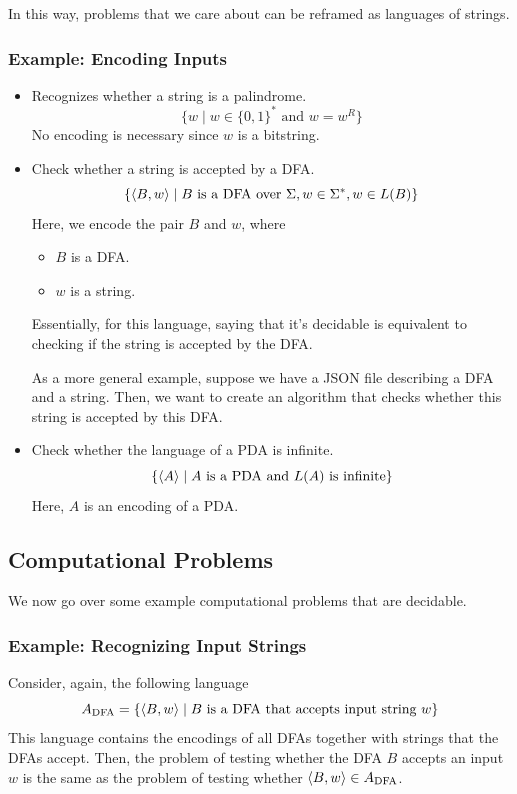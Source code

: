\documentclass[letterpaper]{article}
\begin{document}
In this way, problems that we care about can be reframed as languages of strings. 

\subsubsection{Example: Encoding Inputs}
\begin{itemize}
    \item Recognizes whether a string is a palindrome. 
    \[\{w \mid w \in \{0, 1\}^* \text{ and } w = w^R\}\]
    No encoding is necessary since $w$ is a bitstring. 

    \item Check whether a string is accepted by a DFA. 
    \[\{\langle B, w \rangle \mid B \text{ is a DFA over } \Sigma, w \in \Sigma^*, w \in L(B)\}\]
    Here, we encode the pair $B$ and $w$, where 
    \begin{itemize}
        \item $B$ is a DFA. 
        \item $w$ is a string. 
    \end{itemize}
    Essentially, for this language, saying that it's decidable is equivalent to checking if the string is accepted by the DFA. 

    \bigskip 

    As a more general example, suppose we have a JSON file describing a DFA and a string. Then, we want to create an algorithm that checks whether this string is accepted by this DFA. 

    \item Check whether the language of a PDA is infinite.
    \[\{\langle A \rangle \mid A \text{ is a PDA and } L(A) \text{ is infinite}\}\]
    Here, $A$ is an encoding of a PDA. 
\end{itemize}

\subsection{Computational Problems}
We now go over some example computational problems that are decidable.

\subsubsection{Example: Recognizing Input Strings}
Consider, again, the following language 
\[A_{\text{DFA}} = \{\langle B, w \rangle \mid B \text{ is a DFA that accepts input string } w\}\]
This language contains the encodings of all DFAs together with strings that the DFAs accept. Then, the problem of testing whether the DFA $B$ accepts an input $w$ is the same as the problem of testing whether $\langle B, w \rangle \in A_{\text{DFA}}$. 
\end{document}
